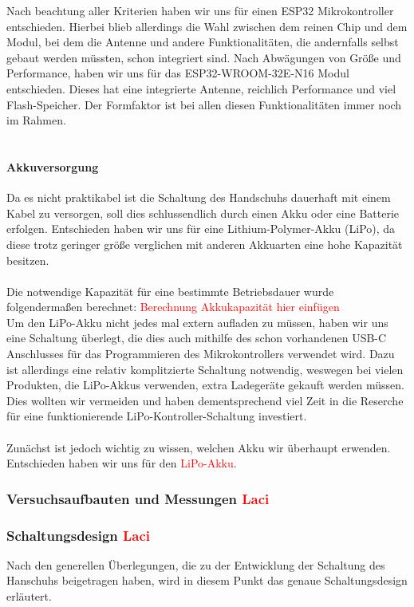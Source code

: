 \documentclass[titlepage,12pt,twoside]{article}
\begin{document}
Nach beachtung aller Kriterien haben wir uns für einen ESP32 Mikrokontroller entschieden. Hierbei blieb allerdings die Wahl zwischen
dem reinen Chip und dem Modul, bei dem die Antenne und andere Funktionalitäten, die andernfalls selbst gebaut werden müssten,
schon integriert sind. Nach Abwägungen von Größe und Performance, haben wir uns für das ESP32-WROOM-32E-N16 Modul entschieden.
Dieses hat eine integrierte Antenne, reichlich Performance und viel Flash-Speicher. Der Formfaktor ist bei allen diesen 
Funktionalitäten immer noch im Rahmen. \\
\\
\paragraph{Akkuversorgung}
\hfill \break
\hfill \break
Da es nicht praktikabel ist die Schaltung des Handschuhs dauerhaft mit einem Kabel zu versorgen, soll dies schlussendlich durch
einen Akku oder eine Batterie erfolgen. Entschieden haben wir uns für eine Lithium-Polymer-Akku (LiPo), da diese trotz geringer 
größe verglichen mit anderen Akkuarten eine hohe Kapazität besitzen. \\
\\
Die notwendige Kapazität für eine bestimmte Betriebsdauer wurde folgendermaßen berechnet:
\textcolor{red}{Berechnung Akkukapazität hier einfügen}
\\
Um den LiPo-Akku nicht jedes mal extern aufladen zu müssen, haben wir uns eine Schaltung überlegt, die dies auch mithilfe des
schon vorhandenen USB-C Anschlusses für das Programmieren des Mikrokontrollers verwendet wird. Dazu ist allerdings eine relativ 
komplitzierte Schaltung notwendig, weswegen bei vielen Produkten, die LiPo-Akkus verwenden, extra Ladegeräte gekauft werden müssen.
Dies wollten wir vermeiden und haben dementsprechend viel Zeit in die Reserche für eine funktionierende LiPo-Kontroller-Schaltung
investiert. \\
\\
Zunächst ist jedoch wichtig zu wissen, welchen Akku wir überhaupt erwenden. Entschieden haben wir uns für den \textcolor{red}{LiPo-Akku}.
\\

\subsubsection{Versuchsaufbauten und Messungen \textcolor{red}{Laci}}


\subsubsection{Schaltungsdesign \textcolor{red}{Laci}}
Nach den generellen Überlegungen, die zu der Entwicklung der Schaltung des Hanschuhs beigetragen haben, wird in diesem Punkt 
das genaue Schaltungsdesign erläutert. \\
\\
\end{document}
